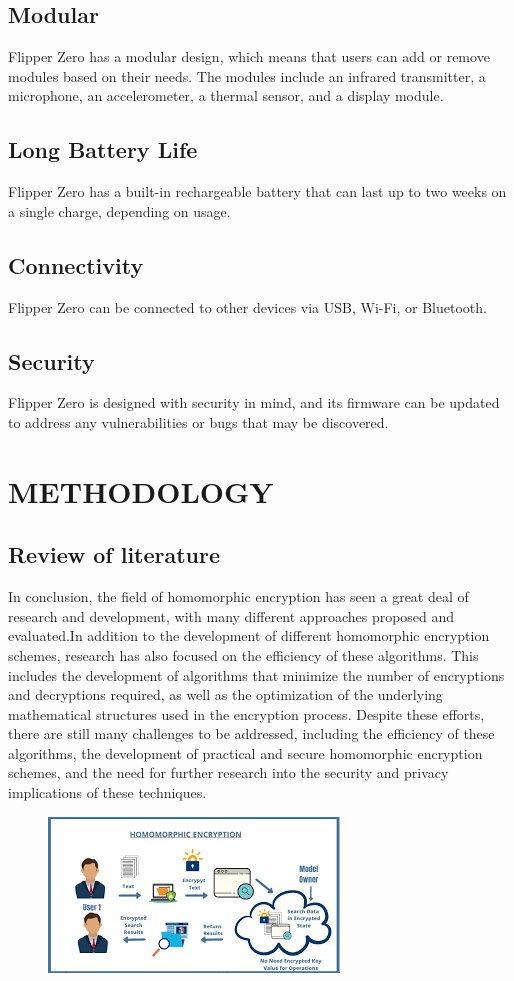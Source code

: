 \documentclass[a4paper,11pt]{report}
\begin{document}
\section{Modular}
Flipper Zero has a modular design, which means that users can add or remove modules based on their needs. The modules include an infrared transmitter, a microphone, an accelerometer, a thermal sensor, and a display module.
\section{Long Battery Life}
Flipper Zero has a built-in rechargeable battery that can last up to two weeks on a single charge, depending on usage.
\section{Connectivity}
Flipper Zero can be connected to other devices via USB, Wi-Fi, or Bluetooth.
\section{Security}
Flipper Zero is designed with security in mind, and its firmware can be updated to address any vulnerabilities or bugs that may be discovered.

\chapter{METHODOLOGY}
\section{Review of literature}
In conclusion, the field of homomorphic encryption has seen a great deal of research and development, with many different approaches proposed and evaluated.In addition to the development of different homomorphic encryption schemes, research has also focused on the efficiency of these algorithms. This includes the development of algorithms that minimize the number of encryptions and decryptions required, as well as the optimization of the underlying mathematical structures used in the encryption process. Despite these efforts, there are still many challenges to be addressed, including the efficiency of these algorithms, the development of practical and secure homomorphic encryption schemes, and the need for further research into the security and privacy implications of these techniques.
\begin{figure}[h]
	\centering
	\hspace{21pt}
	\includegraphics[width=.70\linewidth]{he.jpg}
	\label{fig:he.jpg}
\end{figure}
\end{document}
